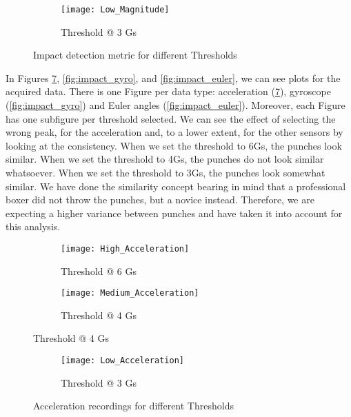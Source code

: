 \begin{figure}[hbt!]\ContinuedFloat
	\centering
	\begin{subfigure}{0.9\linewidth}
		\centering
		\texttt{[image: Low\_Magnitude]}
		\caption{Threshold @ 3 Gs}
		\label{fig:low_mag}
	\end{subfigure}
	\caption{Impact detection metric for different Thresholds}
	\label{fig:impact_mag}
\end{figure}

In Figures \ref{fig:impact_acc}, \ref{fig:impact_gyro}, and \ref{fig:impact_euler}, we can see plots for the acquired data. There is one Figure per data type: acceleration (\ref{fig:impact_acc}), gyroscope (\ref{fig:impact_gyro}) and Euler angles (\ref{fig:impact_euler}). Moreover, each Figure has one subfigure per threshold selected. We can see the effect of selecting the wrong peak, for the acceleration and, to a lower extent, for the other sensors by looking at the consistency. When we set the threshold to 6Gs, the punches look similar. When we set the threshold to 4Gs, the punches do not look similar whatsoever. When we set the threshold to 3Gs, the punches look somewhat similar. We have done the similarity concept bearing in mind that a professional boxer did not throw the punches, but a novice instead. Therefore, we are expecting a higher variance between punches and have taken it into account for this analysis.

\begin{figure}[hbt!]
	\centering
	\begin{subfigure}{0.9\linewidth}
		\centering
		\texttt{[image: High\_Acceleration]}
		\caption{Threshold @ 6 Gs}
		\label{fig:high_acc}
	\end{subfigure}
	\begin{subfigure}{0.9\linewidth}
		\centering
		\texttt{[image: Medium\_Acceleration]}
		\caption{Threshold @ 4 Gs}
		\label{fig:medium_acc}
	\end{subfigure}
\end{figure}

\begin{figure}[hbt!]\ContinuedFloat
	\centering
	\begin{subfigure}{0.9\linewidth}
		\centering
		\texttt{[image: Low\_Acceleration]}
		\caption{Threshold @ 3 Gs}
		\label{fig:low_acc}
	\end{subfigure}
	\caption{Acceleration recordings for different Thresholds}
	\label{fig:impact_acc}
\end{figure}

